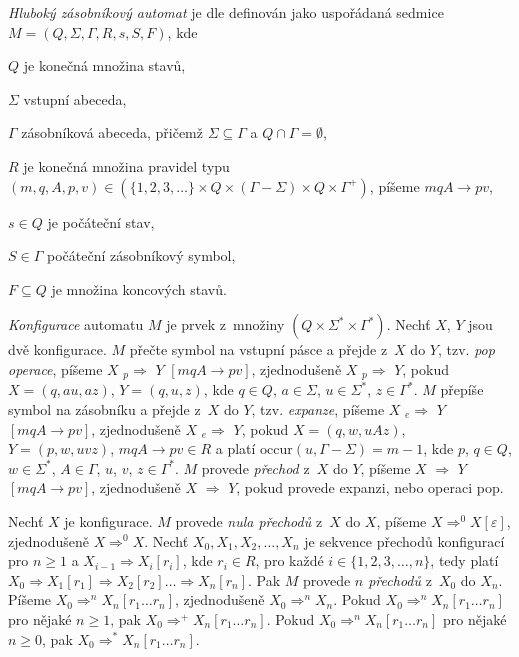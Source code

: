 
\begin{Def} \label{def_deep_pda}
\emph{Hluboký zásobníkový automat} je dle \cite{Meduna:DeepPDA} definován jako uspořádaná sedmice $M = (Q,\Sigma,\Gamma, R, s, S, F)$, kde 

\begin{description*}
\item  $Q$ je konečná množina stavů, 
\item  $\Sigma$ vstupní abeceda, 
\item  $\Gamma$ zásobníková abeceda, přičemž $\Sigma \subseteq \Gamma$ a $Q \cap \Gamma = \emptyset$,
\item  $R$ je konečná množina pravidel typu $(m, q, A, p, v) \in (\{1,2,3,\dots\} \times Q \times (\Gamma-\Sigma)\times   Q \times {\Gamma}^+)$, píšeme $mqA \rightarrow pv$,
\item  $s \in Q$ je počáteční stav, 
\item  $S \in \Gamma$ počáteční zásobníkový symbol, 
\item  $F \subseteq Q$ je množina koncových stavů.
\end{description*}

\emph{Konfigurace} automatu $M$ je prvek z~množiny $(Q \times \Sigma^* \times \Gamma^*)$. 
Nechť $X$, $Y$ jsou dvě konfigurace. 
$M$ přečte symbol na vstupní pásce a přejde z~$X$ do $Y$, tzv. \emph{pop operace}, píšeme $X$  ${}_p{\Rightarrow}$  $Y$ $[mqA \rightarrow pv]$, zjednodušeně $X$  ${}_p{\Rightarrow}$  $Y$, pokud $X = (q, au, az)$, $Y = (q, u, z)$, kde $q \in Q$, $a \in \Sigma$, $u \in \Sigma^*$, $z \in \Gamma^*$.
$M$ přepíše symbol na zásobníku a přejde z~$X$ do $Y$, tzv. \emph{expanze}, píšeme $X$  ${}_e{\Rightarrow}$  $Y$ $[mqA \rightarrow pv]$, zjednodušeně $X$  ${}_e{\Rightarrow}$  $Y$, pokud $X = (q, w, uAz)$, $Y = (p, w, uvz)$, $mqA \rightarrow pv \in R$ a platí $\mathrm{occur}(u,\Gamma - \Sigma) = m - 1 $, kde $p$, $q \in Q$, $w \in \Sigma^*$, $A \in \Gamma$, $u$, $v$, $z \in \Gamma^*$. 
$M$ provede \emph{přechod} z~$X$ do $Y$, píšeme $X$  ${\Rightarrow}$  $Y$ $[mqA \rightarrow pv]$, zjednodušeně $X$  ${\Rightarrow}$  $Y$, pokud provede expanzi, nebo operaci pop.

Nechť $X$ je konfigurace. $M$ provede \emph{nula přechodů} z~$X$ do $X$, píšeme $X \Rightarrow^0 X [\varepsilon]$, zjednodušeně $X \Rightarrow^0 X$. Nechť $X_0, X_1, X_2,\dots,X_n $ je sekvence přechodů konfigurací pro $n \ge 1$  a $X_{i-1} \Rightarrow X_i [r_i]$, kde $r_i \in R$, pro každé $i \in \{1, 2, 3,\dots, n\}$, tedy platí $X_0 \Rightarrow X_1 [r_1] \Rightarrow X_2 [r_2] \dots \Rightarrow X_n [r_n]$. Pak $M$ provede \emph{$n$ přechodů} z~$X_0$ do $X_n$. Píšeme $X_{0} \Rightarrow^n X_n [r_1 \dots r_n]$, zjednodušeně $X_{0} \Rightarrow^n X_n$. Pokud $X_{0} \Rightarrow^n X_n [r_1 \dots r_n]$ pro nějaké $n \ge 1$, pak $X_{0} \Rightarrow^+ X_n [r_1 \dots r_n]$. Pokud $X_{0} \Rightarrow^n X_n [r_1 \dots r_n]$ pro nějaké $n \ge 0$, pak $X_{0} \Rightarrow^* X_n [r_1 \dots r_n]$.


\end{Def}

